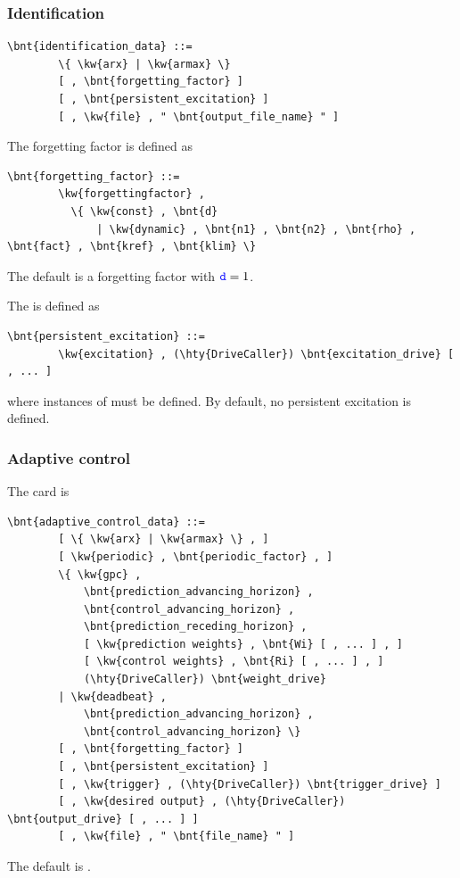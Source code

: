 \subsubsection{Identification}
\begin{Verbatim}[commandchars=\\\{\}]
    \bnt{identification_data} ::=
        \{ \kw{arx} | \kw{armax} \}
        [ , \bnt{forgetting_factor} ]
        [ , \bnt{persistent_excitation} ]
        [ , \kw{file} , " \bnt{output_file_name} " ]
\end{Verbatim}
The forgetting factor is defined as
\begin{Verbatim}[commandchars=\\\{\}]
    \bnt{forgetting_factor} ::=
        \kw{forgettingfactor} ,
          \{ \kw{const} , \bnt{d}
              | \kw{dynamic} , \bnt{n1} , \bnt{n2} , \bnt{rho} , \bnt{fact} , \bnt{kref} , \bnt{klim} \}
\end{Verbatim}
The default is a  forgetting factor with $\textcolor{blue}{\texttt{d}}=1$.

The  is defined as
\begin{Verbatim}[commandchars=\\\{\}]
    \bnt{persistent_excitation} ::=
        \kw{excitation} , (\hty{DriveCaller}) \bnt{excitation_drive} [ , ... ]
\end{Verbatim}
where  instances of  must be defined.
By default, no persistent excitation is defined.

\subsubsection{Adaptive control}
The  card is
\begin{Verbatim}[commandchars=\\\{\}]
    \bnt{adaptive_control_data} ::=
        [ \{ \kw{arx} | \kw{armax} \} , ]
        [ \kw{periodic} , \bnt{periodic_factor} , ]
        \{ \kw{gpc} ,
            \bnt{prediction_advancing_horizon} ,
            \bnt{control_advancing_horizon} ,
            \bnt{prediction_receding_horizon} ,
            [ \kw{prediction weights} , \bnt{Wi} [ , ... ] , ]
            [ \kw{control weights} , \bnt{Ri} [ , ... ] , ]
            (\hty{DriveCaller}) \bnt{weight_drive}
        | \kw{deadbeat} ,
            \bnt{prediction_advancing_horizon} ,
            \bnt{control_advancing_horizon} \}
        [ , \bnt{forgetting_factor} ]
        [ , \bnt{persistent_excitation} ]
        [ , \kw{trigger} , (\hty{DriveCaller}) \bnt{trigger_drive} ]
        [ , \kw{desired output} , (\hty{DriveCaller}) \bnt{output_drive} [ , ... ] ]
        [ , \kw{file} , " \bnt{file_name} " ]
\end{Verbatim}
The default is .

